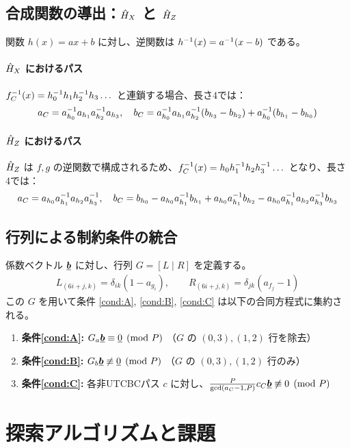 \documentclass[a4paper,11pt,dvipdfmx]{jsarticle}
\theoremstyle{definition}
\begin{document}
\subsection{合成関数の導出：$\hat{H}_X$ と $\hat{H}_Z$}
関数 $h(x)=ax+b$ に対し、逆関数は $h^{-1}(x)=a^{-1}(x-b)$ である。
\paragraph{$\hat{H}_X$ におけるパス}
$f_C^{-1}(x) = h_0^{-1} h_1 h_2^{-1} h_3 \dots$ と連鎖する場合、長さ4では：
\begin{align}
  a_C = a_{h_0}^{-1} a_{h_1}a_{h_2}^{-1} a_{h_3}, \quad b_C = a_{h_0}^{-1} a_{h_1}a_{h_2}^{-1}(b_{h_3}-b_{h_2}) + a_{h_0}^{-1}(b_{h_1}-b_{h_0})
\end{align}
\paragraph{$\hat{H}_Z$ におけるパス}
$\hat{H}_Z$ は $f, g$ の逆関数で構成されるため、$f_C^{-1}(x) = h_0 h_1^{-1} h_2 h_3^{-1} \dots$ となり、長さ4では：
\begin{align}
  a_C = a_{h_0}a_{h_1}^{-1} a_{h_2}a_{h_3}^{-1}, \quad b_C = b_{h_0} - a_{h_0}a_{h_1}^{-1} b_{h_1} + a_{h_0}a_{h_1}^{-1} b_{h_2} - a_{h_0}a_{h_1}^{-1} a_{h_2}a_{h_3}^{-1} b_{h_3}
\end{align}

\subsection{行列による制約条件の統合}
係数ベクトル $\underline{\bm{b}}$ に対し、行列 $G = [L \mid R]$ を定義する。
\begin{align}
  L_{(6i+j, k)} = \delta_{ik}(1-a_{g_i}), \qquad R_{(6i+j, k)} = \delta_{jk}(a_{f_j}-1)
\end{align}
この $G$ を用いて条件 \ref{cond:A}, \ref{cond:B}, \ref{cond:C} は以下の合同方程式に集約される。
\begin{enumerate}
  \item \textbf{条件\ref{cond:A}:} $G_a \underline{\bm{b}} \equiv \underline{0} \pmod P$ （$G$ の $(0,3), (1,2)$ 行を除去）
  \item \textbf{条件\ref{cond:B}:} $G_b \underline{\bm{b}} \not\equiv \underline{0} \pmod P$ （$G$ の $(0,3), (1,2)$ 行のみ）
  \item \textbf{条件\ref{cond:C}:} 各非UTCBCパス $c$ に対し、$\frac{P}{\gcd(a_C-1, P)} c_C \underline{\bm{b}} \not\equiv 0 \pmod P$
\end{enumerate}

\section{探索アルゴリズムと課題}
\end{document}
